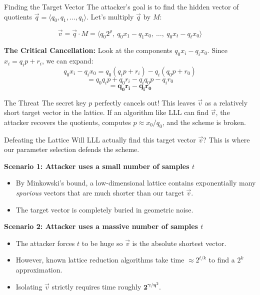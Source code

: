 \documentclass[10pt,handout]{beamer}
\begin{document}
\begin{frame}{Finding the Target Vector}
    The attacker's goal is to find the hidden vector of quotients $\vec{q} = \langle q_0, q_1, \dots, q_t \rangle$. Let's multiply $\vec{q}$ by $M$:
    
    $$ \vec{v} = \vec{q} \cdot M = \langle q_0 2^\rho, \ q_0 x_1 - q_1 x_0, \ \dots, \ q_0 x_t - q_t x_0 \rangle $$
    \pause
    
    \vspace{0.3cm}
    \textbf{The Critical Cancellation:} 
    Look at the components $q_0 x_i - q_i x_0$. Since $x_i = q_i p + r_i$, we can expand:
    $$ q_0 x_i - q_i x_0 = q_0(q_i p + r_i) - q_i(q_0 p + r_0) $$
    $$ = q_0 q_i p + q_0 r_i - q_i q_0 p - q_i r_0 $$
    $$ = \mathbf{q_0 r_i - q_i r_0} $$
    \pause
    
    \begin{block}{The Threat}
    The secret key $p$ perfectly cancels out! This leaves $\vec{v}$ as a relatively short target vector in the lattice. If an algorithm like LLL can find $\vec{v}$, the attacker recovers the quotients, computes $p \approx x_0 / q_0$, and the scheme is broken.
    \end{block}
\end{frame}

\begin{frame}{Defeating the Lattice}
    Will LLL actually find this target vector $\vec{v}$? This is where our parameter selection defends the scheme.
    \pause
    
    \vspace{0.3cm}
    \textbf{Scenario 1: Attacker uses a small number of samples $t$}
    \begin{itemize}
        \item By Minkowski's bound, a low-dimensional lattice contains exponentially many \textit{spurious} vectors that are much shorter than our target $\vec{v}$. 
        \item The target vector is completely buried in geometric noise.
    \end{itemize}
    \pause
    
    \vspace{0.3cm}
    \textbf{Scenario 2: Attacker uses a massive number of samples $t$}
    \begin{itemize}
        \item The attacker forces $t$ to be huge so $\vec{v}$ is the absolute shortest vector.
        \item However, known lattice reduction algorithms take time $\approx 2^{t/k}$ to find a $2^k$ approximation.
        \item Isolating $\vec{v}$ strictly requires time roughly $\mathbf{2^{\gamma / \eta^2}}$.
    \end{itemize}
\end{frame}
\end{document}
